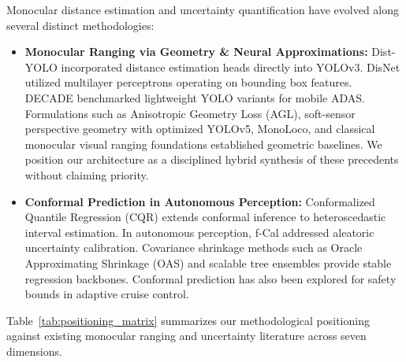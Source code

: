 \documentclass[]{spie}  %
\begin{document}
Monocular distance estimation and uncertainty quantification have evolved along several distinct methodologies:
\begin{itemize}
    \item \textbf{Monocular Ranging via Geometry \& Neural Approximations:} Dist-YOLO\cite{vajgl2022distyolo} incorporated distance estimation heads directly into YOLOv3. DisNet\cite{haseeb2018disnet} utilized multilayer perceptrons operating on bounding box features. DECADE\cite{decade2024monocular} benchmarked lightweight YOLO variants for mobile ADAS. Formulations such as Anisotropic Geometry Loss (AGL)\cite{agl2026lightweight}, soft-sensor perspective geometry with optimized YOLOv5\cite{ni2026realtime}, MonoLoco\cite{bertoni2019monoloco}, and classical monocular visual ranging foundations\cite{dagan2004forward,geiger2012kitti} established geometric baselines. We position our architecture as a disciplined hybrid synthesis of these precedents without claiming priority.
    \item \textbf{Conformal Prediction in Autonomous Perception:} Conformalized Quantile Regression (CQR)\cite{romano2019cqr} extends conformal inference to heteroscedastic interval estimation. In autonomous perception, f-Cal\cite{bhatt2021fcal} addressed aleatoric uncertainty calibration. Covariance shrinkage methods such as Oracle Approximating Shrinkage (OAS)\cite{chen2010oas} and scalable tree ensembles\cite{chen2016xgboost} provide stable regression backbones. Conformal prediction has also been explored for safety bounds in adaptive cruise control\cite{dewan2024conformal}.
\end{itemize}

Table~\ref{tab:positioning_matrix} summarizes our methodological positioning against existing monocular ranging and uncertainty literature across seven dimensions.
\end{document}
